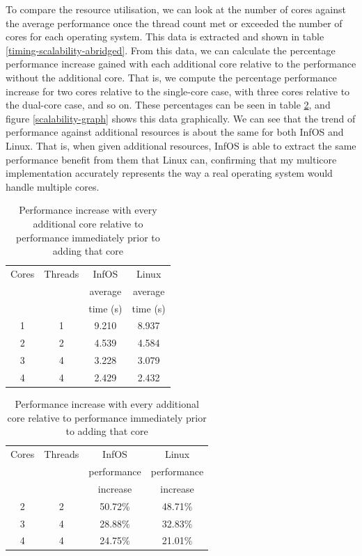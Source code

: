 \documentclass[bsc,frontabs,singlespacing,parskip,deptreport]{infthesis}
\begin{document}
To compare the resource utilisation, we can look at the number of cores against the average performance once the thread count met or exceeded the number of cores for each operating system. This data is extracted and shown in table \ref{timing-scalability-abridged}. From this data, we can calculate the percentage performance increase gained with each additional core relative to the performance without the additional core. That is, we compute the percentage performance increase for two cores relative to the single-core case, with three cores relative to the dual-core case, and so on. These percentages can be seen in table \ref{timing-scalability-percentages}, and figure \ref{scalability-graph} shows this data graphically. We can see that the trend of performance against additional resources is about the same for both InfOS and Linux. That is, when given additional resources, InfOS is able to extract the same performance benefit from them that Linux can, confirming that my multicore implementation accurately represents the way a real operating system would handle multiple cores.

\begin{table}[h]
\parbox{.45\linewidth}{
\centering
\scriptsize
\begin{tabular}{cccc}\toprule
Cores & Threads & InfOS & Linux \\
& & average & average \\
& & time (s) & time (s) \\
\midrule
1 & 1 & 9.210 & 8.937 \\
\midrule
2 & 2 & 4.539 & 4.584 \\
\midrule
3 & 4 & 3.228 & 3.079 \\
\midrule
4 & 4 & 2.429 & 2.432 \\
\bottomrule
\end{tabular}
\caption{Average time taken in seconds for InfOS and Linux to execute the scalability benchmark once the thread count met or exceeded the number of cores}\label{timing-scalability-abridged}
}
\hfill
\parbox{.45\linewidth}{
\centering
\scriptsize
\begin{tabular}{cccc}\toprule
Cores & Threads & InfOS & Linux \\
& & performance & performance \\
& & increase & increase \\
\midrule
2 & 2 & 50.72\% & 48.71\% \\
\midrule
3 & 4 & 28.88\% & 32.83\% \\
\midrule
4 & 4 & 24.75\% & 21.01\% \\
\bottomrule
\end{tabular}
\caption{Performance increase with every additional core relative to performance immediately prior to adding that core}\label{timing-scalability-percentages}
}
\end{table}
\end{document}
